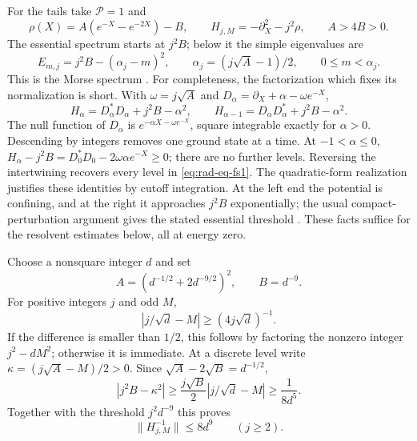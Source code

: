 For the tails take $\mathcal P=1$ and
\[
 \rho(X)=A(e^{-X}-e^{-2X})-B,
 \qquad H_{j,M}=-\partial_X^2-j^2\rho,
 \qquad A>4B>0.
\]
The essential spectrum starts at $j^2B$; below it the simple eigenvalues
are
\begin{equation}\label{eq:rad-eq-fs1}
 E_{m,j}=j^2B-(\alpha_j-m)^2,
 \qquad \alpha_j=(j\sqrt A-1)/2,\qquad 0\le m<\alpha_j.
\end{equation}
This is the Morse spectrum \cite{Morse1929}.  For completeness, the
factorization which fixes its normalization is short.  With
$\omega=j\sqrt A$ and $D_\alpha=\partial_X+\alpha-\omega e^{-X}$,
\[
 H_\alpha=D_\alpha^*D_\alpha+j^2B-\alpha^2,
 \qquad
 H_{\alpha-1}=D_\alpha D_\alpha^*+j^2B-\alpha^2.
\]
The null function of $D_\alpha$ is
$e^{-\alpha X-\omega e^{-X}}$, square integrable exactly for
$\alpha>0$.  Descending by integers removes one ground state at a
time.  At $-1<\alpha\le0$,
$H_\alpha-j^2B=D_0^*D_0-2\omega\alpha e^{-X}\ge0$;
there are no further levels.  Reversing the intertwining recovers every
level in \eqref{eq:rad-eq-fs1}.  The quadratic-form realization justifies
these identities by cutoff integration.  At the left end the potential
is confining, and at the right it approaches $j^2B$ exponentially;
the usual compact-perturbation argument gives the stated essential
threshold \cite[Theorem~6.19]{Teschl2009}.  These facts suffice for the
resolvent estimates below, all at energy zero.

Choose a nonsquare integer $d$ and set
\begin{equation}\label{eq:rad-eq-rm5}
 A=(d^{-1/2}+2d^{-9/2})^2,
 \qquad B=d^{-9}.
\end{equation}
For positive integers $j$ and odd $M$,
\[
 |j/\sqrt d-M|\ge (4j\sqrt d)^{-1}.
\]
If the difference is smaller than $1/2$, this follows by factoring the
nonzero integer $j^2-dM^2$; otherwise it is immediate.  At a discrete
level write $\kappa=(j\sqrt A-M)/2>0$.  Since
$\sqrt A-2\sqrt B=d^{-1/2}$,
\[
 |j^2B-\kappa^2|
 \ge \frac{j\sqrt B}{2}|j/\sqrt d-M|
 \ge\frac1{8d^5}.
\]
Together with the threshold $j^2d^{-9}$ this proves
\begin{equation}\label{eq:rad-eq-rm1}
 \|H_{j,M}^{-1}\|\le8d^9\qquad(j\ge2).
\end{equation}

